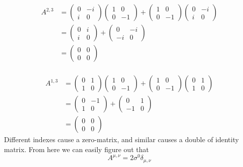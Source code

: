 \documentclass[letter]{article}
\begin{document}
\begin{align*}
	A^{2,3} &= 
	\begin{pmatrix} 0 & -i \\ i & 0 \end{pmatrix} 
	\begin{pmatrix} 1 & 0 \\ 0 & -1 \end{pmatrix}  
+	\begin{pmatrix} 1 & 0 \\ 0 & -1 \end{pmatrix}  
	\begin{pmatrix} 0 & -i \\ i & 0 \end{pmatrix} 
	\\ 
			  &= \begin{pmatrix} 0 & i \\ i & 0 \end{pmatrix}  
	+ \begin{pmatrix}  0 & -i \\ -i & 0\end{pmatrix} 
			  \\
			     &= \begin{pmatrix} 0 & 0 \\ 0 & 0 \end{pmatrix}  \\
\end{align*}


\begin{align*}
	A^{1,3} &= 
	\begin{pmatrix} 0 & 1 \\ 1 & 0 \end{pmatrix} 
	\begin{pmatrix} 1 & 0 \\ 0 & -1 \end{pmatrix}  +
	\begin{pmatrix} 1 & 0 \\ 0 & -1 \end{pmatrix}  
	\begin{pmatrix} 0 & 1 \\ 1 & 0 \end{pmatrix}\\ &=
	\begin{pmatrix} 0 & -1 \\ 1 & 0 \end{pmatrix}  + 
	\begin{pmatrix} 0 & 1 \\ -1 & 0 \end{pmatrix}  \\ 
			  &= \begin{pmatrix} 0 & 0 \\ 0 & 0 \end{pmatrix}  
\end{align*}
Different indexes cause a zero-matrix, and similar causes a double of identity matrix. 
From here we can easily figure out that 
\[
	A^{\mu, \nu} = 2 \sigma^{0} \delta_{\mu, \nu}
\]
\end{document}
